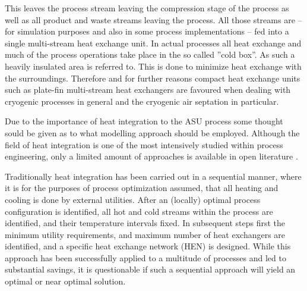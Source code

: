     This leaves the process stream leaving the compression stage of the process as well as all product and waste streams
    leaving the process. All those streams are -- for simulation purposes and also in some process implementations  -- fed
    into a single multi-stream heat exchange unit. In actual processes all heat exchange and much of the process operations
    take place in the so called ''cold box''. As such a heavily insulated area is referred to. This is done to minimize
    heat exchange with the surroundings. Therefore and for further reasons compact heat exchange units such as plate-fin
    multi-stream heat exchangers are favoured when dealing with cryogenic processes in general and the cryogenic air septation
    in particular.

    Due to the importance of heat integration to the ASU process some thought sould be given as to what modelling approach
    should be employed. Although the field of heat integration is one of the most intensively studied within process engineering,
    only  a limited amount of approaches is available in open literature \cite{Kamath.2012}.

    Traditionally heat integration has been carried out in a sequential manner, where it is for the purposes of process
    optimization assumed, that all heating and cooling is done by external utilities. After an (locally) optimal
    process configuration is identified, all hot and cold streams within the process are identified, and their
    temperature intervals fixed. %
    In subsequent steps first the minimum utility requirements, and maximum number of heat exchangers are identified,
    and a specific heat exchange network (HEN) is designed. 
    While this approach has been successfully applied to a multitude of processes and led to substantial savings,
    it is questionable if such a sequential approach will yield an optimal or near optimal solution.

